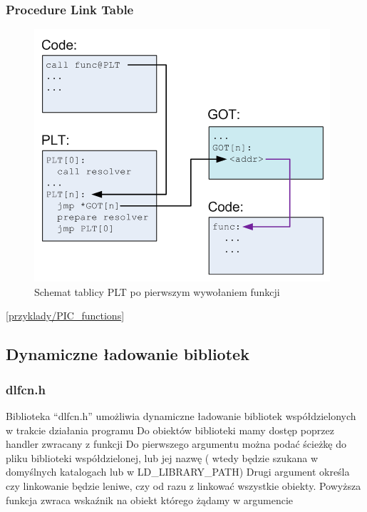 \begin{frame}[t]\frametitle{Procedure Link Table}
  \begin{figure}
    \includegraphics[height=0.65\textheight]{PLT1.png}
    \caption{Schemat tablicy PLT po pierwszym wywołaniem funkcji\cite{PIC}}
  \end{figure}
  [\url{przyklady/PIC_functions}]
\end{frame}

\subsection{Dynamiczne ładowanie bibliotek}

\begin{frame}[t]\frametitle{dlfcn.h}
 \cite{tldp} Biblioteka ``dlfcn.h'' umożliwia dynamiczne ładowanie bibliotek
  współdzielonych w trakcie działania programu
\newline
  Do obiektów biblioteki mamy dostęp poprzez handler zwracany z funkcji
  \newline
  Do pierwszego argumentu można podać ścieżkę do pliku biblioteki
  współdzielonej, lub jej nazwę ( wtedy będzie szukana w domyślnych katalogach
  lub w LD\_LIBRARY\_PATH)
\newline
  Drugi argument określa czy linkowanie będzie leniwe, czy od razu z linkować
  wszystkie obiekty.
\newline
\newline
  Powyższa funkcja zwraca wskaźnik na obiekt którego żądamy w argumencie

\end{frame}

